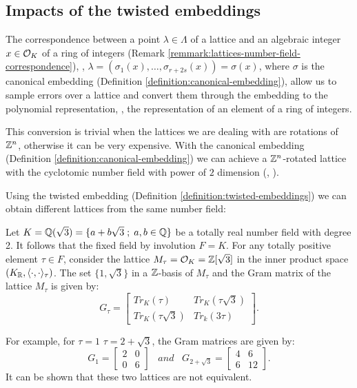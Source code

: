 \documentclass[a4paper,12pt]{article}
\begin{document}
\subsection{Impacts of the twisted embeddings}
\label{sec:org249acbc}

   \begin{text}
  The correspondence between a point $\lambda \in \Lambda$ of a lattice and an algebraic
  integer $x \in \mathcal{O}_K$ of a ring of integers (Remark \ref{remmark:lattices-number-field-correspondence}),
  \ie, $\lambda = (\sigma_1(x), \dots, \sigma_{r+2s}(x)) = \sigma(x)$, where $\sigma$ is the
  canonical embedding (Definition \ref{definition:canonical-embedding}), allow us to
  sample errors over a lattice and convert them through the embedding to the
  polynomial representation, \ie, the representation of an element of a ring of
  integers.

  This conversion is trivial when the lattices we are dealing with are rotations of
  $\mathbb{Z}^n$, otherwise it can be very expensive. With the canonical embedding
  (Definition \ref{definition:canonical-embedding}) we can achieve a $\mathbb{Z}^n$-rotated
  lattice with the cyclotomic number field with power of $2$ dimension
  (\cite{Lyubashevsky2010}, \cite{DucasDurmos2012}).

  Using the twisted embedding (Definition \ref{definition:twisted-embeddings}) we can obtain
  different lattices from the same number field:

\end{text}

   \begin{example}\label{example:twisted-embeddings-generating-different-lattices-from-the-same-ring}
  Let $K = \mathbb{Q}(\sqrt{3}) = \{a + b\sqrt{3} \;;\; a,b \in \mathbb{Q}\}$ be a totally
  real number field with degree 2. It follows that the fixed field by
  involution $F=K$. For any totally positive element $\tau \in F$, consider
  the lattice $M_\tau = \mathcal{O}_K = \mathbb{Z}[\sqrt{3}]$ in the inner product space
  $(K_{\mathbb{R}},\langle \cdot,\cdot \rangle_\tau)$. The set $\{1,\sqrt{3}\}$ in a
  $\mathbb{Z}$-basis of $M_\tau$ and the Gram matrix of the lattice $M_\tau$ is given by:
  \[G_\tau =
    \begin{bmatrix}
      Tr_K(\tau) & Tr_K(\tau\sqrt{3}) \\
      Tr_K(\tau\sqrt{3}) & Tr_k(3\tau)
    \end{bmatrix}.
  \]

  For example, for $\tau = 1$  $\tau = 2 + \sqrt{3}$, the Gram matrices are
  given by:
  \[
    G_1 =
    \begin{bmatrix}
      2 & 0 \\
      0 & 6
    \end{bmatrix}
    \;\;\;and\;\;\;
    G_{2+\sqrt{3}} =
    \begin{bmatrix}
      4 & 6 \\
      6 & 12
    \end{bmatrix}.
  \]
  It can be shown that these two lattices are not equivalent.
\end{example}
\end{document}
